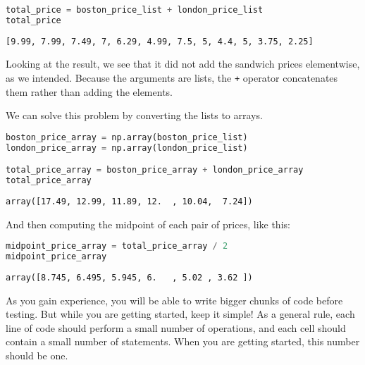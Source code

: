 \begin{lstlisting}[language=Python]
total_price = boston_price_list + london_price_list
total_price
\end{lstlisting}

\begin{lstlisting}[]
[9.99, 7.99, 7.49, 7, 6.29, 4.99, 7.5, 5, 4.4, 5, 3.75, 2.25]
\end{lstlisting}

Looking at the result, we see that it did not add the sandwich prices
elementwise, as we intended. Because the arguments are lists, the
\passthrough{\lstinline!+!} operator concatenates them rather than
adding the elements.

We can solve this problem by converting the lists to arrays.

\begin{lstlisting}[language=Python]
boston_price_array = np.array(boston_price_list)
london_price_array = np.array(london_price_list)

total_price_array = boston_price_array + london_price_array
total_price_array
\end{lstlisting}

\begin{lstlisting}[]
array([17.49, 12.99, 11.89, 12.  , 10.04,  7.24])
\end{lstlisting}

And then computing the midpoint of each pair of prices, like this:

\begin{lstlisting}[language=Python]
midpoint_price_array = total_price_array / 2
midpoint_price_array
\end{lstlisting}

\begin{lstlisting}[]
array([8.745, 6.495, 5.945, 6.   , 5.02 , 3.62 ])
\end{lstlisting}

As you gain experience, you will be able to write bigger chunks of code
before testing. But while you are getting started, keep it simple! As a
general rule, each line of code should perform a small number of
operations, and each cell should contain a small number of statements.
When you are getting started, this number should be one.

